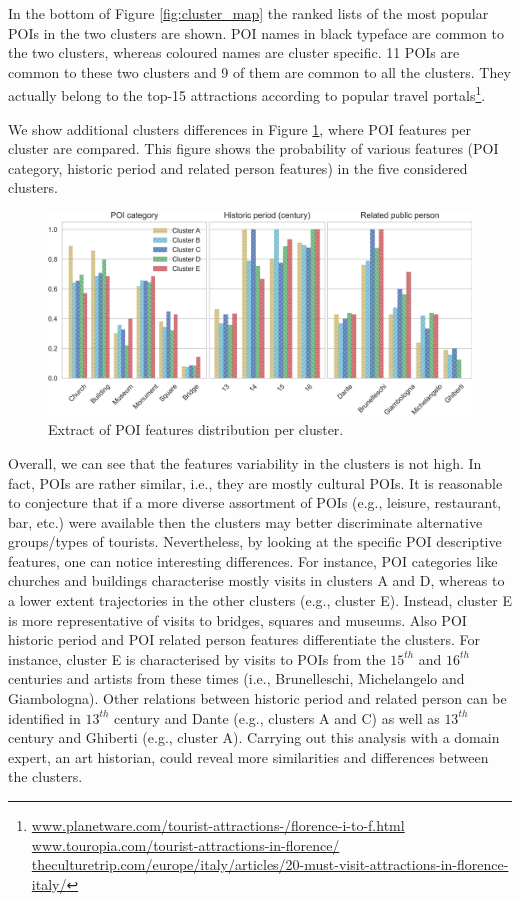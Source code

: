 In the bottom of Figure \ref{fig:cluster_map} the ranked lists of the most popular POIs in the two clusters are shown. POI names in black typeface are common to the two clusters, whereas coloured names are cluster specific. 11 POIs are common to these two clusters and 9 of them are common to all the clusters. They actually belong to the top-15 attractions according to popular travel portals\footnote{
	\url{www.planetware.com/tourist-attractions-/florence-i-to-f.html} \\  
	\url{www.touropia.com/tourist-attractions-in-florence/} \\ \url{theculturetrip.com/europe/italy/articles/20-must-visit-attractions-in-florence-italy/}
}.

We show additional clusters differences in Figure \ref{fig:cluster_poi}, where POI features per cluster are compared.
This figure shows the probability of various features (POI category, historic period and related person features) in the five considered clusters.

\begin{figure}
	\centering
	\includegraphics[width=1\linewidth]{cluster_comparison_poifeatures}
	\caption{Extract of POI features distribution per cluster.}
	\label{fig:cluster_poi}
\end{figure} 

Overall, we can see that the features variability in the clusters is not high. In fact, POIs are rather similar, i.e., they are mostly cultural POIs. It is reasonable to conjecture that if a more diverse assortment of POIs (e.g., leisure, restaurant, bar, etc.) were available then the clusters may better discriminate alternative groups/types of tourists. Nevertheless, by looking at the specific POI descriptive features, one can notice interesting differences. For instance, POI categories like churches and buildings characterise mostly visits in clusters A and D, whereas to a lower extent trajectories in the other clusters (e.g., cluster E). Instead, cluster E is more representative of visits to bridges, squares and museums. Also POI historic period and POI related person features differentiate the clusters. For instance, cluster E is characterised by visits to POIs from the $15^{th}$ and $16^{th}$ centuries and artists from these times (i.e., Brunelleschi, Michelangelo and Giambologna).
Other relations between historic period and related person can be identified in $13^{th}$ century and Dante (e.g., clusters A and C) as well as $13^{th}$ century and Ghiberti (e.g., cluster A). Carrying out this analysis with a domain expert, an art historian, could reveal more similarities and differences between the clusters. 

